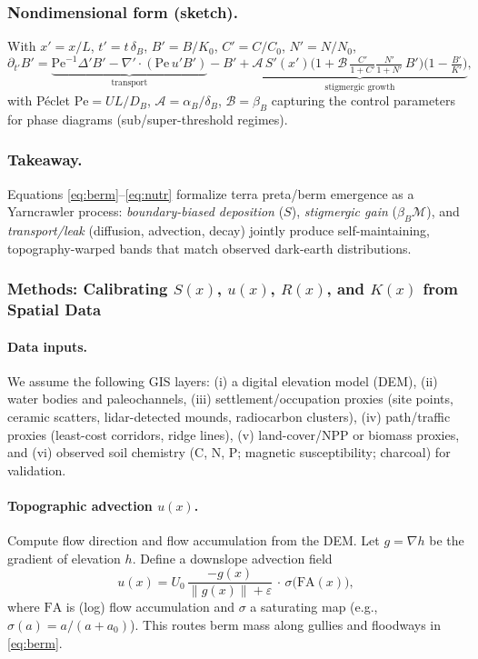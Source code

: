 \documentclass{article}
\begin{document}
\subsubsection{Nondimensional form (sketch).}
With $x'=x/L$, $t'=t\,\delta_B$, $B'=B/K_0$, $C'=C/C_0$, $N'=N/N_0$,
\[
\partial_{t'} B'=\underbrace{\mathrm{Pe}^{-1}\Delta' B' - \nabla'\!\cdot(\mathrm{Pe}\,u' B')}_{\text{transport}}
- B' + \underbrace{\mathcal{A}\,S'(x')\Big(1+\mathcal{B}\,\tfrac{C'}{1+C'}\tfrac{N'}{1+N'}\,B'\Big)\big(1-\tfrac{B'}{K'}\big)}_{\text{stigmergic growth}},
\]
with Péclet $\mathrm{Pe}=UL/D_B$, $\mathcal{A}=\alpha_B/\delta_B$, $\mathcal{B}=\beta_B$ capturing the control parameters for phase diagrams (sub/super-threshold regimes).

\subsubsection{Takeaway.}
Equations \eqref{eq:berm}–\eqref{eq:nutr} formalize terra preta/berm emergence as a Yarncrawler process: \emph{boundary-biased deposition} ($S$), \emph{stigmergic gain} ($\beta_B\mathcal{M}$), and \emph{transport/leak} (diffusion, advection, decay) jointly produce self-maintaining, topography-warped bands that match observed dark-earth distributions.

\subsubsection{Methods: Calibrating $S(x)$, $u(x)$, $R(x)$, and $K(x)$ from Spatial Data}

\paragraph{Data inputs.}
We assume the following GIS layers: (i) a digital elevation model (DEM), (ii) water bodies and paleochannels, (iii) settlement/occupation proxies (site points, ceramic scatters, lidar-detected mounds, radiocarbon clusters), (iv) path/traffic proxies (least-cost corridors, ridge lines), (v) land-cover/NPP or biomass proxies, and (vi) observed soil chemistry (C, N, P; magnetic susceptibility; charcoal) for validation.

\paragraph{Topographic advection $u(x)$.}
Compute flow direction and flow accumulation from the DEM. Let $g=\nabla h$ be the gradient of elevation $h$. Define a downslope advection field
\[
u(x)=U_0\,\frac{-g(x)}{\|g(x)\|+\varepsilon}\,\cdot\,\sigma\!\big(\mathrm{FA}(x)\big),
\]
where $\mathrm{FA}$ is (log) flow accumulation and $\sigma$ a saturating map (e.g., $\sigma(a)=a/(a+a_0)$). This routes berm mass along gullies and floodways in \eqref{eq:berm}.
\end{document}
